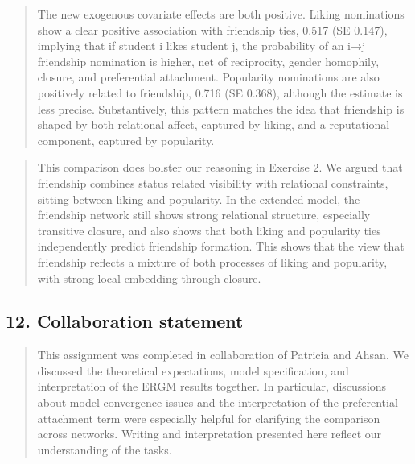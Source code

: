 \documentclass[
  letterpaper,
  DIV=11,
  numbers=noendperiod]{scrartcl}
\begin{document}
\begin{quote}
The new exogenous covariate effects are both positive. Liking
nominations show a clear positive association with friendship ties,
0.517 (SE 0.147), implying that if student i likes student j, the
probability of an i→j friendship nomination is higher, net of
reciprocity, gender homophily, closure, and preferential attachment.
Popularity nominations are also positively related to friendship, 0.716
(SE 0.368), although the estimate is less precise. Substantively, this
pattern matches the idea that friendship is shaped by both relational
affect, captured by liking, and a reputational component, captured by
popularity.
\end{quote}

\begin{quote}
This comparison does bolster our reasoning in Exercise 2. We argued that
friendship combines status related visibility with relational
constraints, sitting between liking and popularity. In the extended
model, the friendship network still shows strong relational structure,
especially transitive closure, and also shows that both liking and
popularity ties independently predict friendship formation. This shows
that the view that friendship reflects a mixture of both processes of
liking and popularity, with strong local embedding through closure.
\end{quote}

\subsection{12. Collaboration statement}\label{collaboration-statement}

\begin{quote}
This assignment was completed in collaboration of Patricia and Ahsan. We
discussed the theoretical expectations, model specification, and
interpretation of the ERGM results together. In particular, discussions
about model convergence issues and the interpretation of the
preferential attachment term were especially helpful for clarifying the
comparison across networks. Writing and interpretation presented here
reflect our understanding of the tasks.
\end{quote}
\end{document}

